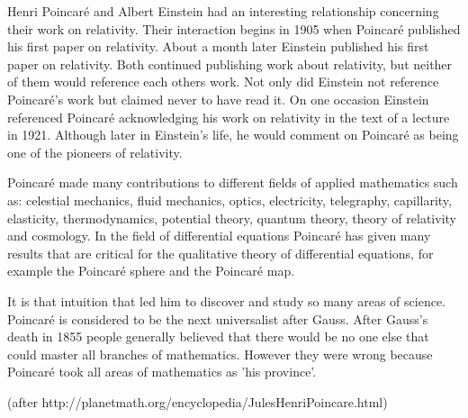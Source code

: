 Henri Poincar\'{e} and Albert Einstein had an interesting relationship concerning their work on relativity. Their interaction begins in 1905 when Poincar\'{e} published his first paper on relativity. About a month later Einstein published his first paper on relativity. Both continued publishing work about relativity, but neither of them would reference each others work. Not only did Einstein not reference Poincar\'{e}'s work but claimed never to have read it. On one occasion Einstein referenced Poincar\'{e} acknowledging his work on relativity in the text of a lecture in 1921. Although later in Einstein's life, he would comment on Poincar\'{e} as being one of the pioneers of relativity.

Poincar\'{e} made many contributions to different fields of applied mathematics such as: celestial mechanics, fluid mechanics, optics, electricity, telegraphy, capillarity, elasticity, thermodynamics, potential theory, quantum theory, theory of relativity and cosmology. In the field of differential equations Poincar\'{e} has given many results that are critical for the qualitative theory of differential equations, for example the Poincar\'{e} sphere and the Poincar\'{e} map.

It is that intuition that led him to discover and study so many areas of science. Poincar\'{e} is considered to be the next universalist after Gauss. After Gauss's death in 1855 people generally believed that there would be no one else that could master all branches of mathematics. However they were wrong because Poincar\'{e} took all areas of mathematics as 'his province'.

(after http://planetmath.org/encyclopedia/JulesHenriPoincare.html)
